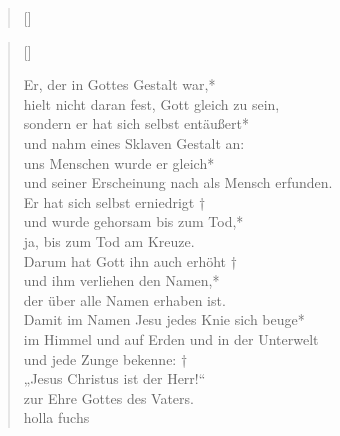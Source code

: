 \begin{verse}[\versewidth]
 
\end{verse}


\vspace{0.6cm}



\begin{verse}[\versewidth]


Er, der in Gottes Gestalt war,*\\
hielt nicht daran fest, Gott gleich zu sein,\\
\vin sondern er hat sich selbst entäußert*\\
\vin und nahm eines Sklaven Gestalt an:\\
uns Menschen wurde er gleich*\\
und seiner Erscheinung nach als Mensch erfunden.\\
\vin Er hat sich selbst erniedrigt †\\
\vin und wurde gehorsam bis zum Tod,*\\
\vin ja, bis zum Tod am Kreuze.\\
Darum hat Gott ihn auch erhöht †\\
und ihm verliehen den Namen,*\\
der über alle Namen erhaben ist.\\
\vin Damit im Namen Jesu jedes Knie sich beuge*\\
\vin im Himmel und auf Erden und in der Unterwelt\\
und jede Zunge bekenne: †\\
„Jesus Christus ist der Herr!“\\
zur Ehre Gottes des Vaters.\\	holla fuchs

\end{verse}